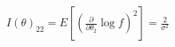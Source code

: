 \documentclass[preview]{standalone}
\begin{document}
\begin{align*}
I(\theta)_{22} = E\left[\left(\frac{\partial}{\partial\theta_2} \log f\right)^2\right] = \frac{2}{\sigma^2}
\end{align*}
\end{document}
